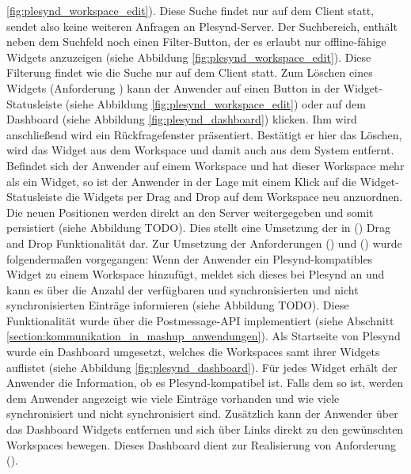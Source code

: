 \ref{fig:plesynd_workspace_edit}). Diese Suche findet nur auf dem Client statt, sendet also keine weiteren Anfragen an Plesynd-Server. Der Suchbereich, enthält neben dem Suchfeld noch einen Filter-Button, der es erlaubt nur offline-fähige Widgets anzuzeigen (siehe Abbildung \ref{fig:plesynd_workspace_edit}). Diese Filterung findet wie die Suche nur auf dem Client statt. Zum Löschen eines Widgets (Anforderung  \emph{\requirementWidgetDelete}) kann der Anwender auf einen Button in der Widget-Statusleiste (siehe Abbildung \ref{fig:plesynd_workspace_edit}) oder auf dem Dashboard (siehe Abbildung \ref{fig:plesynd_dashboard}) klicken. Ihm wird anschließend wird ein Rückfragefenster präsentiert. Bestätigt er hier das Löschen, wird das Widget aus dem Workspace und damit auch aus dem System entfernt. Befindet sich der Anwender auf einem Workspace und hat dieser Workspace mehr als ein Widget, so ist der Anwender in der Lage mit einem Klick auf die Widget-Statusleiste die Widgets per Drag and Drop auf dem Workspace neu anzuordnen. Die neuen Positionen werden direkt an den Server weitergegeben und somit persistiert (siehe Abbildung TODO). Dies stellt eine Umsetzung der in  (\emph{\requirementWidgetSortDragNDrop}) Drag and Drop Funktionalität dar. Zur Umsetzung der Anforderungen  (\emph{\requirementWidgetInformSystem}) und  (\emph{\requirementWidgetInformUser})  wurde folgendermaßen vorgegangen: Wenn der Anwender ein Plesynd-kompatibles Widget zu einem Workspace hinzufügt, meldet sich dieses bei Plesynd an und kann es über die Anzahl der verfügbaren und synchronisierten und nicht synchronisierten Einträge informieren (siehe Abbildung TODO). Diese Funktionalität wurde über die Postmessage-API implementiert (siehe Abschnitt \ref{section:kommunikation_in_mashup_anwendungen}). Als Startseite von Plesynd wurde ein Dashboard umgesetzt, welches die Workspaces samt ihrer Widgets auflistet (siehe Abbildung \ref{fig:plesynd_dashboard}). Für jedes Widget erhält der Anwender die Information, ob es Plesynd-kompatibel ist. Falls dem so ist, werden dem Anwender angezeigt wie viele Einträge vorhanden und wie viele synchronisiert und nicht synchronisiert sind. Zusätzlich kann der Anwender über das Dashboard Widgets entfernen und sich über Links direkt zu den gewünschten Workspaces bewegen. Dieses Dashboard dient zur Realisierung von Anforderung  (\emph{\requirementDashboard}).

